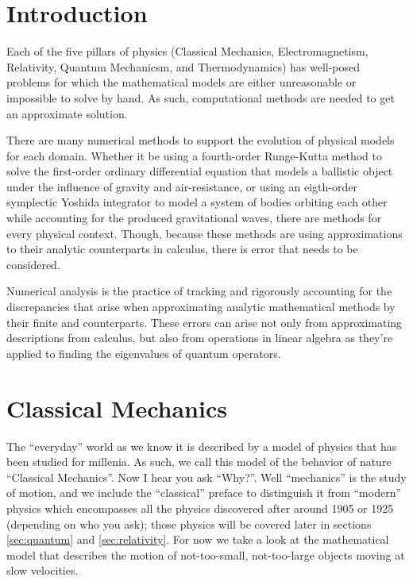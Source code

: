 \documentclass{report}
\begin{document}
\section{Introduction}

    Each of the five pillars of physics (Classical Mechanics, Electromagnetism, Relativity, Quantum Mechanicsm, and Thermodynamics) has well-posed problems for which the mathematical models are either unreasonable or impossible to solve by hand.  As such, computational methods are needed to get an approximate solution.  
    
    There are many numerical methods to support the evolution of physical models for each domain.  Whether it be using a fourth-order Runge-Kutta method to solve the first-order ordinary differential equation that models a ballistic object under the influence of gravity and air-resistance, or using an eigth-order symplectic Yoshida integrator to model a system of bodies orbiting each other while accounting for the produced gravitational waves, there are methods for every physical context.  Though, because these methods are using approximations to their analytic counterparts in calculus, there is error that needs to be considered.

    Numerical analysis is the practice of tracking and rigorously accounting for the discrepancies that arise when approximating analytic mathematical methods by their finite and counterparts.  These errors can arise not only from approximating descriptions from calculus, but also from operations in linear algebra as they're applied to finding the eigenvalues of quantum operators.

\section{Classical Mechanics} \label{sec:classical}

    The ``everyday'' world as we know it is described by a model of physics that has been studied for millenia.  As such, we call this model of the behavior of nature ``Classical Mechanics''.  Now I hear you ask ``Why?''.  Well ``mechanics'' is the study of motion, and we include the ``classical'' preface to distinguish it from ``modern'' physics which encompasses all the physics discovered after around 1905 or 1925 (depending on who you ask); those physics will be covered later in sections \ref{sec:quantum} and \ref{sec:relativity}.  For now we take a look at the mathematical model that describes the motion of not-too-small, not-too-large objects moving at slow velocities.
    
\end{document}
